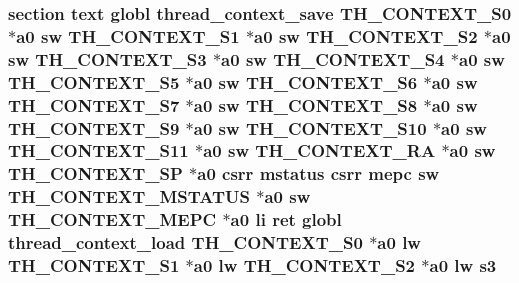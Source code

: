 \hypertarget{riscv_2kpanica_8S_aed39cde7cf01852081f61d277eef2953}{
\subsubsection[{s3}]{\setlength{\rightskip}{0pt plus 5cm}section text globl {\bf thread\-\_\-context\-\_\-save} {\bf T\-H\-\_\-\-C\-O\-N\-T\-E\-X\-T\-\_\-\-S0} $\ast${\bf a0} {\bf sw} {\bf T\-H\-\_\-\-C\-O\-N\-T\-E\-X\-T\-\_\-\-S1} $\ast${\bf a0} {\bf sw} {\bf T\-H\-\_\-\-C\-O\-N\-T\-E\-X\-T\-\_\-\-S2} $\ast${\bf a0} {\bf sw} {\bf T\-H\-\_\-\-C\-O\-N\-T\-E\-X\-T\-\_\-\-S3} $\ast${\bf a0} {\bf sw} {\bf T\-H\-\_\-\-C\-O\-N\-T\-E\-X\-T\-\_\-\-S4} $\ast${\bf a0} {\bf sw} {\bf T\-H\-\_\-\-C\-O\-N\-T\-E\-X\-T\-\_\-\-S5} $\ast${\bf a0} {\bf sw} {\bf T\-H\-\_\-\-C\-O\-N\-T\-E\-X\-T\-\_\-\-S6} $\ast${\bf a0} {\bf sw} {\bf T\-H\-\_\-\-C\-O\-N\-T\-E\-X\-T\-\_\-\-S7} $\ast${\bf a0} {\bf sw} {\bf T\-H\-\_\-\-C\-O\-N\-T\-E\-X\-T\-\_\-\-S8} $\ast${\bf a0} {\bf sw} {\bf T\-H\-\_\-\-C\-O\-N\-T\-E\-X\-T\-\_\-\-S9} $\ast${\bf a0} {\bf sw} {\bf T\-H\-\_\-\-C\-O\-N\-T\-E\-X\-T\-\_\-\-S10} $\ast${\bf a0} {\bf sw} {\bf T\-H\-\_\-\-C\-O\-N\-T\-E\-X\-T\-\_\-\-S11} $\ast${\bf a0} {\bf sw} {\bf T\-H\-\_\-\-C\-O\-N\-T\-E\-X\-T\-\_\-\-R\-A} $\ast${\bf a0} {\bf sw} {\bf T\-H\-\_\-\-C\-O\-N\-T\-E\-X\-T\-\_\-\-S\-P} $\ast${\bf a0} csrr {\bf mstatus} csrr {\bf mepc} {\bf sw} {\bf T\-H\-\_\-\-C\-O\-N\-T\-E\-X\-T\-\_\-\-M\-S\-T\-A\-T\-U\-S} $\ast${\bf a0} {\bf sw} {\bf T\-H\-\_\-\-C\-O\-N\-T\-E\-X\-T\-\_\-\-M\-E\-P\-C} $\ast${\bf a0} {\bf li} ret globl {\bf thread\-\_\-context\-\_\-load} {\bf T\-H\-\_\-\-C\-O\-N\-T\-E\-X\-T\-\_\-\-S0} $\ast${\bf a0} {\bf lw} {\bf T\-H\-\_\-\-C\-O\-N\-T\-E\-X\-T\-\_\-\-S1} $\ast${\bf a0} {\bf lw} {\bf T\-H\-\_\-\-C\-O\-N\-T\-E\-X\-T\-\_\-\-S2} $\ast${\bf a0} {\bf lw} s3}}\label{riscv_2kpanica_8S_aed39cde7cf01852081f61d277eef2953}
